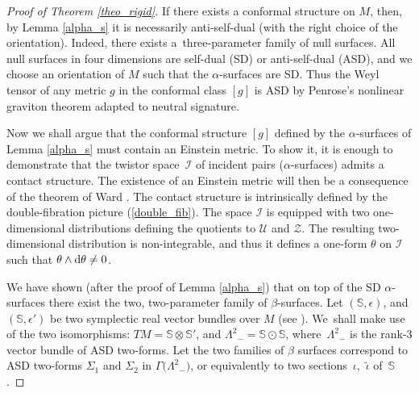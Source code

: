 \documentclass[pdftex]{sigma}%
\numberwithin{equation}{section}
\newcommand{\Z}{\mathbb{Z}}
\def\I{\mathcal{I}}
\newcommand{\spp}{\mathbb{S}}
\renewcommand{\Z}{\mathcal{Z}}
\newcommand{\U}{\mathcal{U}}
\begin{document}
\begin{proof}[Proof of Theorem \ref{theo_rigid}]
If there exists a conformal structure on $M$, then, by Lemma \ref{alpha_s}
it is necessarily anti-self-dual (with the right choice of the orientation).
Indeed, there exists a~three-parameter family of null surfaces. All null
surfaces in four dimensions are self-dual (SD) or anti-self-dual (ASD), and we choose an orientation
of $M$ such that the $\alpha$-surfaces are SD. Thus the Weyl
tensor of any metric $g$ in the conformal class $[g]$ is ASD by Penrose's nonlinear graviton theorem
\cite{Penrose} adapted to neutral signature.

Now we shall argue that the conformal structure $[g]$ defined
by the $\alpha$-surfaces of Lemma \ref{alpha_s} must contain an Einstein
metric. To show it, it is enough to demonstrate that the twistor
space~$\I$ of incident pairs ($\alpha$-surfaces) admits a contact structure.
The existence of an Einstein metric will then be a consequence of
the theorem of Ward \cite{Ward_cosmo}. The contact
structure is intrinsically defined by the double-fibration picture
(\ref{double_fib}). The space $\I$ is equipped with two one-dimensional
distributions defining the quotients to $\U$ and $\Z$. The resulting
two-dimensional distribution is non-integrable, and thus it defines
a one-form $\theta$ on $\I$ such that $\theta\wedge {\rm d}\theta\neq 0$.

We have shown (after the proof of Lemma \ref{alpha_s}) that
on top of the SD $\alpha$-surfaces there exist the two, two-parameter
family of $\beta$-surfaces.
Let $(\spp, \epsilon)$, and $(\spp, \epsilon')$ be two symplectic
real vector bundles over $M$ (see \cite{ADM, AHS}). We~shall make use of the two isomorphisms: $TM=\spp\otimes \spp'$, and
${\Lambda^2}_-=\spp\odot \spp$, where~${\Lambda^2}_-$ is the rank-3 vector bundle of
ASD two-forms.
Let the two families of
$\beta$ surfaces correspond to ASD two-forms
$\Sigma_1$ and $\Sigma_2$ in $\Gamma\big({\Lambda^2}_-\big)$, or equivalently to two
sections~$\iota$,~$\tilde{\iota}$ of~$\spp$.


\end{proof}
\end{document}
